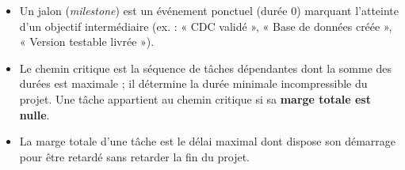 \documentclass[11pt]{article}
\newcommand{\cle}[1]{{\popxbold\color{popdark}#1}}
\begin{document}
\begin{definition}
\begin{itemize}
\item Un \cle{jalon} (\emph{milestone}) est un événement ponctuel (durée 0) marquant l'atteinte d'un objectif intermédiaire (ex. : « CDC validé », « Base de données créée », « Version testable livrée »).
\item Le \cle{chemin critique} est la séquence de tâches dépendantes dont la somme des durées est maximale ; il détermine la durée minimale incompressible du projet. Une tâche appartient au chemin critique si sa \textbf{marge totale est nulle}.
\item La \cle{marge totale} d'une tâche est le délai maximal dont dispose son démarrage pour être retardé sans retarder la fin du projet.
\end{itemize}
\end{definition}
\end{document}
